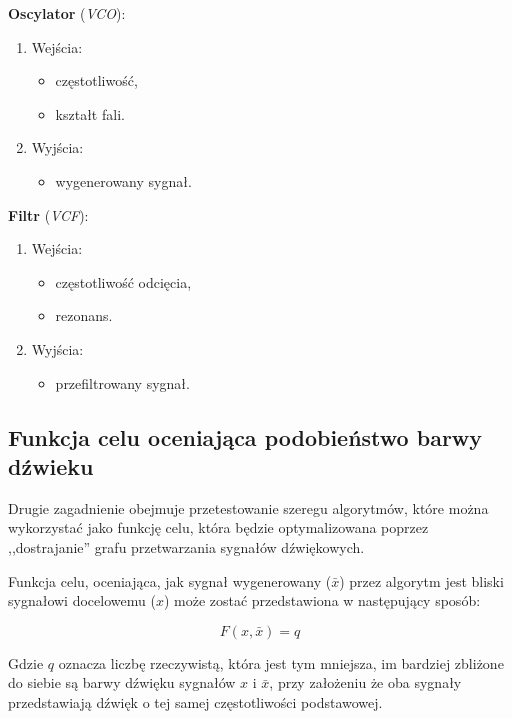 \begin{multicols}{2}

\noindent
\textbf{Oscylator} (\textit{VCO}):
\begin{enumerate}
  \item Wejścia:
    \begin{itemize}
      \item częstotliwość,
      \item kształt fali.
    \end{itemize}
  \item Wyjścia:
    \begin{itemize}
      \item wygenerowany sygnał.
    \end{itemize}
\end{enumerate}

\noindent
\textbf{Filtr} (\textit{VCF}):
\begin{enumerate}
  \item Wejścia:
    \begin{itemize}
      \item częstotliwość odcięcia,
      \item rezonans.
    \end{itemize}
  \item Wyjścia:
    \begin{itemize}
      \item przefiltrowany sygnał.
    \end{itemize}
\end{enumerate}
\end{multicols}

\subsection{Funkcja celu oceniająca podobieństwo barwy dźwieku}

Drugie zagadnienie obejmuje przetestowanie szeregu algorytmów, które można wykorzystać jako funkcję celu,
która będzie optymalizowana poprzez ,,dostrajanie'' grafu przetwarzania sygnałów dźwiękowych.

Funkcja celu, oceniająca, jak sygnał wygenerowany ($\bar{x}$) przez algorytm jest bliski sygnałowi docelowemu ($x$)
może zostać przedstawiona w następujący sposób:

\begin{equation}
  F(x, \bar{x}) = q
  \label{eq:target_function}
\end{equation}

\noindent
Gdzie $q$ oznacza liczbę rzeczywistą, która jest tym mniejsza, im bardziej zbliżone do siebie są barwy dźwięku sygnałów $x$ i $\bar{x}$,
przy założeniu że oba sygnały przedstawiają dźwięk o tej samej częstotliwości podstawowej.

